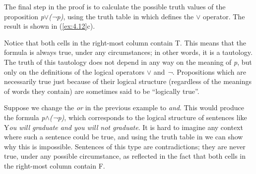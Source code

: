 The final step in the proof is to calculate the possible truth values of the proposition \textit{p$\vee$}\textit{(¬}\textit{p)}, using the truth table in  which defines the \textit{$\vee$} operator. The result is shown in (\ref{ex:4.12}c). 


\setcounter{equation}{11}

Notice that both cells in the right-most column contain T. This means that the formula is always true, under any circumstances; in other words, it is a tautology. The truth of this tautology does not depend in any way on the meaning of \textit{p}, but only on the definitions of the logical operators \textit{$\vee$} and \textit{¬}. Propositions which are necessarily true just because of their logical structure (regardless of the meanings of words they contain) are sometimes said to be “logically true”.



Suppose we change the \textit{or} in the previous example to \textit{and}. This would produce the formula \textit{p$\wedge$}\textit{(¬}\textit{p)}, which corresponds to the logical structure of sentences like Y\textit{ou will graduate and you will not graduate}. It is hard to imagine any context where such a sentence could be true, and using the truth table in  we can show why this is impossible. Sentences of this type are contradictions; they are never true, under any possible circumstance, as reflected in the fact that both cells in the right-most column contain F.



